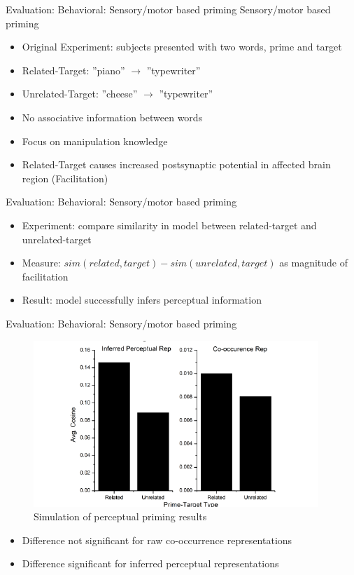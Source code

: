 \documentclass[12pt,a4paper]{beamer}
\begin{document}
\begin{frame}{Evaluation: Behavioral: Sensory/motor based priming}
Sensory/motor based priming
\begin{itemize}
\item Original Experiment: subjects presented with two words, prime and target
\item Related-Target: ''piano'' $\to$ ''typewriter''
\item Unrelated-Target: ''cheese'' $\to$ ''typewriter''
\item No associative information between words
\item Focus on manipulation knowledge
\item Related-Target causes increased postsynaptic potential in affected brain region (Facilitation)
\end{itemize}
\end{frame}

\begin{frame}{Evaluation: Behavioral: Sensory/motor based priming}
\begin{itemize}
\item Experiment: compare similarity in model between related-target and unrelated-target
\item Measure: $sim(related,target) - sim(unrelated,target)$ as magnitude of facilitation
\item Result: model successfully infers perceptual information
\end{itemize}
\end{frame}

\begin{frame}{Evaluation: Behavioral: Sensory/motor based priming}
\begin{figure}
\includegraphics[scale=0.7]{figure_4_perceptual_priming_results.png}
\caption{Simulation of perceptual priming results}
\end{figure}
\begin{itemize}
\item Difference not significant for raw co-occurrence representations
\item Difference significant for inferred perceptual representations
\end{itemize}

\end{frame}
\end{document}
